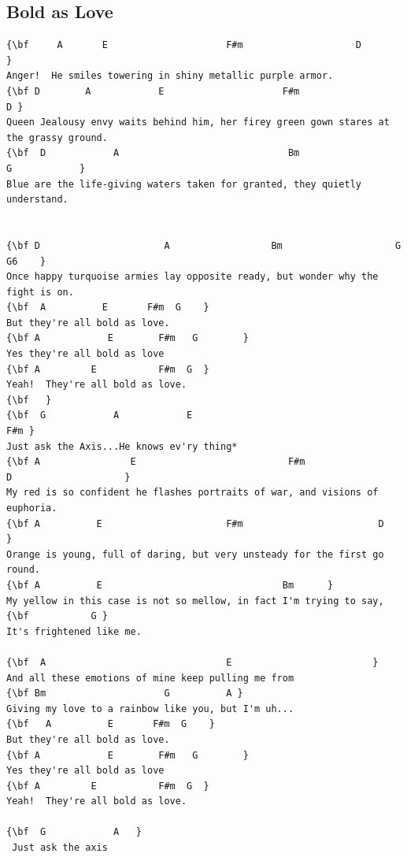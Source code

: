 \documentclass[a4paper]{article}
\begin{document}
\subsection{Bold as Love}
\begin{Verbatim}[commandchars=\\\{\}]
{\bf     A       E                     F#m                    D                    }
Anger!  He smiles towering in shiny metallic purple armor.   
{\bf D        A            E                     F#m                   D }
Queen Jealousy envy waits behind him, her firey green gown stares at the grassy ground.   
{\bf  D            A                              Bm                    G            }
Blue are the life-giving waters taken for granted, they quietly understand. 


{\bf D                      A                  Bm                    G    G6    }
Once happy turquoise armies lay opposite ready, but wonder why the fight is on. 
{\bf  A          E       F#m  G    }
But they're all bold as love. 
{\bf A            E        F#m   G        }
Yes they're all bold as love 
{\bf A         E           F#m  G  }
Yeah!  They're all bold as love. 
{\bf   }
{\bf  G            A            E                                          F#m }
Just ask the Axis...He knows ev'ry thing* 
{\bf A                E                           F#m                    D                    }
My red is so confident he flashes portraits of war, and visions of euphoria.   
{\bf A          E                      F#m                        D                    }
Orange is young, full of daring, but very unsteady for the first go round. 
{\bf A          E                                Bm      }
My yellow in this case is not so mellow, in fact I'm trying to say,  
{\bf           G }
It's frightened like me. 

{\bf  A                                E                         }
And all these emotions of mine keep pulling me from  
{\bf Bm                     G          A }
Giving my love to a rainbow like you, but I'm uh... 
{\bf   A          E       F#m  G    }
But they're all bold as love. 
{\bf A            E        F#m   G        }
Yes they're all bold as love 
{\bf A         E           F#m  G  }
Yeah!  They're all bold as love. 

{\bf  G            A   }
 Just ask the axis

\end{Verbatim}
\newpage
\end{document}
